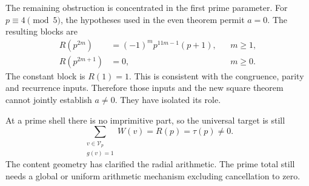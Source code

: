 The remaining obstruction is concentrated in the first prime parameter. For $p\equiv4\pmod5$, the hypotheses used in the even theorem permit $a=0$. The resulting blocks are
\[
\begin{aligned}
R(p^{2m})&=(-1)^mp^{11m-1}(p+1),&&m\ge1,\\
R(p^{2m+1})&=0,&&m\ge0.
\end{aligned}
\]
The constant block is $R(1)=1$. This is consistent with the congruence, parity and recurrence inputs. Therefore those inputs and the new square theorem cannot jointly establish $a\ne0$. They have isolated its role.

At a prime shell there is no imprimitive part, so the universal target is still
\[
\sum_{\substack{v\in\mathcal V_p\\g(v)=1}}W(v)
=R(p)=\tau(p)\ne0.
\]
The content geometry has clarified the radial arithmetic. The prime total still needs a global or uniform arithmetic mechanism excluding cancellation to zero.
